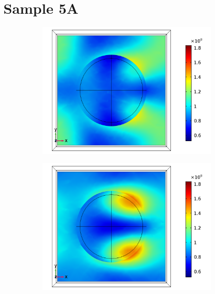\section{Sample 5A}
\begin{figure}[htb!]  %
    \begin{subfigure}{0.32\textwidth}    %
        \centering
        \includegraphics[width=\linewidth]{figures/ch4/S5A/FieldDistribution/Sample5A_TE_Slice@z=-05t_wl=210_notitle.png}
   \end{subfigure}
   \begin{subfigure}{0.32\textwidth}
        \centering
        \includegraphics[width=\linewidth]{figures/ch4/S5A/FieldDistribution/Sample5A_TE_Slice@z=-05t_wl=270_notitle.png}

\end{subfigure}
\end{figure}
